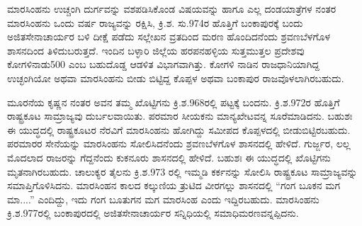 ಮಾರಸಿಂಹನು ಉಚ್ಚಂಗಿ ದುರ್ಗವನ್ನು ವಶಪಡಿಸಿಕೊಂಡ ವಿಷಯವನ್ನು ಹಾಗೂ ಎಲ್ಲ ದಂಡಯಾತ್ರೆಗಳ ನಂತರ ಮಾರಸಿಂಹನು ಒಂದು ವರ್ಷ ರಾಜ್ಯವನ್ನು ರಕ್ಷಿಸಿ, ಕ್ರಿ.ಶ. ಸು.974ರ ಹೊತ್ತಿಗೆ ಬಂಕಾಪುರಕ್ಕೆ ಬಂದು ಅಜಿತಸೇನಾಚಾರ್ಯರ ಬಳಿ ದೀಕ್ಷೆ ಪಡೆದು ಸಲ್ಲೇಖನ ವ್ರತದಿಂದ ಮರಣ ಹೊಂದಿದನೆಂದು ಶ್ರವಣಬೆಳಗೊಳ ಶಾಸನದಿಂದ ತಿಳಿದುಬರುತ್ತದೆ. ಇಂದಿನ ಬಳ್ಳಾರಿ ಜಿಲ್ಲೆಯ ಹರಪನಹಳ್ಳಿಯ ಸುತ್ತಮುತ್ತಲ ಪ್ರದೇಶವು ಕೋಗಳಿನಾಡು\enginline{-}500 ಎಂಬ ಬಹುದೊಡ್ಡ ಆಡಳಿತ ವಿಭಾಗವಾಗಿತ್ತು. ಕೋಗಳಿ ನಾಡಿನ ರಾಜಧಾನಿಯಾಗಿದ್ದ ಉಚ್ಛಂಗಿಯೋ ಅಥವಾ ಮಾರಸಿಂಹನು ಬೀಡು ಬಿಟ್ಟಿದ್ದ ಕೊಪ್ಪಳ ಅಥವಾ ಬಂಕಾಪುರ ರಾಜವೊಳಲಾಗಿರಬಹುದು.

ಮೂರನೆಯ ಕೃಷ್ಣನ ನಂತರ ಅವನ ತಮ್ಮ ಖೊಟ್ಟಿಗನು ಕ್ರಿ.ಶ.968ರಲ್ಲಿ ಪಟ್ಟಕ್ಕೆ ಬಂದನು. ಕ್ರಿ.ಶ.972ರ ಹೊತ್ತಿಗೆ ರಾಷ್ಟ್ರಕೂಟ ಸಾಮ್ರಾಜ್ಯವು ದುರ್ಬಲವಾಯಿತು. ಪರಮಾರ ಸೀಯಕನು ಮಾನ್ಯಖೇಟವನ್ನ ಸೂರೆಮಾಡಿದನು. ಬಹುಶಃ ಈ ಯುದ್ಧದಲ್ಲಿ ರಾಷ್ಟ್ರಕೂಟರ ನೆರವಿಗೆ ಮಾರಸಿಂಹನು ಹೋಗಿದ್ದು ಸಮೀಪದ ಕೊಪ್ಪಳದಲ್ಲಿ ಬೀಡುಬಿಟ್ಟಿರಬಹುದು. ಪರಮಾರರ ಸೇನೆಯನ್ನು ಮಾರಸಿಂಹನು ಸೋಲಿಸಿದನೆಂದು ಶ್ರವಣಬೆಳಗೊಳ ಶಾಸನದಲ್ಲಿ ಹೇಳಿದೆ. ಗುರ್ಜ್ಜರ, ಲಲ್ಲ ಮೊದಲಾದ ರಾಜರನ್ನು ಗೆದ್ದನೆಂದು ಕುಕನೂರು ಶಾಸನದಲ್ಲಿ ಹೇಳಿದೆ. ಬಹುಶಃ ಈ ಯುದ್ಧದಲ್ಲಿ ಖೊಟ್ಟಿಗನು ಮೃತನಾಗಿರಬಹುದು. ಚಾಲುಕ್ಯರ ತೈಲನು ಕ್ರಿ.ಶ.973 ರಲ್ಲಿ ಇಮ್ಮಡಿ ಕರ್ಕನನ್ನು ಸೋಲಿಸಿ ರಾಷ್ಟ್ರಕೂಟ ಸಾಮ್ರಾಜ್ಯವನ್ನು ಸಮಾಪ್ತಿಗೊಳಿಸಿದನು. ಮಾರಸಿಂಹನ ಕಾಲದ ಕಲ್ಕುಣಿಯ ತ್ರುಟಿದ ವೀರಗಲ್ಲು ಶಾಸನದಲ್ಲಿ “ಗಂಗ ಬೂಕನ ಮಗ ಮಾ....” ಎಂದಿದ್ದು, ಇದು ಗಂಗ ಬೂತುಗನ ಮಗ ಮಾರಸಿಂಹ ಎಂದು ಇದ್ದಿರಬಹುದು. ಮಾರಸಿಂಹನು ಕ್ರಿ.ಶ.977ರಲ್ಲಿ ಬಂಕಾಪುರದಲ್ಲಿ ಅಜಿತಸೇನಾಚಾರ್ಯರ ಸನ್ನಿಧಿಯಲ್ಲಿ ಸಮಾಧಿಮರಣವನ್ನಪ್ಪಿದನು.

